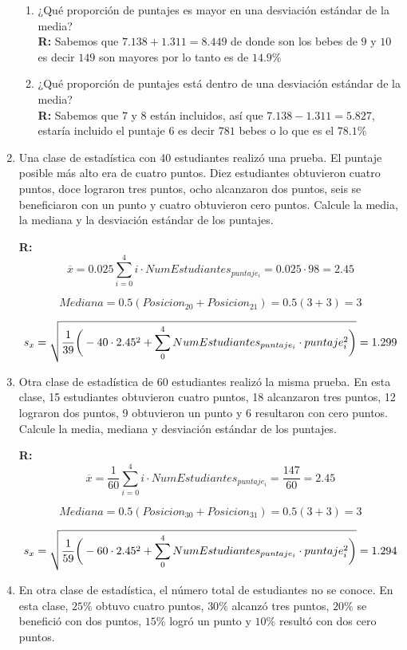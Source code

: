 \documentclass[10pt,a4paper]{book}
\begin{document}
\begin{enumerate}
\begin{enumerate}
		\item ¿Qué proporción de puntajes es mayor en una desviación estándar de la media?\\
		\textbf{R:} Sabemos que $ 7.138 + 1.311 = 8.449$ de donde son los bebes de $ 9 $ y $ 10 $ es decir $ 149 $ son mayores por lo tanto es de $ 14.9\% $
 
		\item ¿Qué proporción de puntajes está dentro de una desviación estándar de la media?\\
		\textbf{R:} Sabemos que $ 7 $ y $ 8 $ están incluidos, así que $ 7.138 - 1.311 = 5.827 $, estaría incluido el puntaje $ 6 $ es decir $ 781 $ bebes o lo que es el $ 78.1\% $
	\end{enumerate}

	\item Una clase de estadística con 40 estudiantes realizó una prueba. El puntaje posible más alto era de cuatro puntos. Diez estudiantes obtuvieron cuatro puntos, doce lograron tres puntos, ocho alcanzaron dos puntos, seis se beneficiaron con un  punto y cuatro obtuvieron cero puntos. Calcule la media, la mediana y la desviación estándar de los puntajes.
	
	\textbf{R:} $$ \overline{x} = 0.025\sum_{i=0}^{4} i \cdot NumEstudiantes_{puntaje_i} = 0.025 \cdot 98 = 2.45 $$
	
	$$ Mediana = 0.5 ( Posicion_{20} + Posicion_{21} ) = 0.5 ( 3 + 3 ) = 3 $$
	
	$$ s_x = \sqrt{\frac{1}{39} \bigg{(} - 40\cdot 2.45^2 + \sum_{0}^{4} NumEstudiantes_{puntaje_i} \cdot puntaje_i^2 \bigg{)}} =  1.299 $$
	
	\item Otra clase de estadística de 60 estudiantes realizó la misma prueba. En esta clase, 15 estudiantes obtuvieron cuatro puntos, 18 alcanzaron tres puntos, 12 lograron dos puntos, 9 obtuvieron un punto y 6 resultaron con cero puntos. Calcule la media, mediana y desviación estándar de los puntajes.
	
	\textbf{R:} $$ \overline{x} = \frac{1}{60} \sum_{i=0}^{4} i \cdot NumEstudiantes_{puntaje_i} = \frac{147}{60} = 2.45  $$
	
	$$ Mediana = 0.5 ( Posicion_{30} + Posicion_{31} ) = 0.5 ( 3 + 3 ) = 3 $$
	
	$$ s_x = \sqrt{\frac{1}{59} \bigg{(} - 60\cdot 2.45^2 + \sum_{0}^{4} NumEstudiantes_{puntaje_i} \cdot puntaje_i^2 \bigg{)}} =  1.294 $$
	
	
	\item En otra clase de estadística, el número total de estudiantes no se conoce. En esta clase, $ 25\% $ obtuvo cuatro puntos, $ 30\% $ alcanzó tres puntos, $ 20\% $ se benefició con dos puntos, $ 15\% $ logró un punto y $ 10\% $ resultó con dos cero puntos.
	

\end{enumerate}
\end{document}
